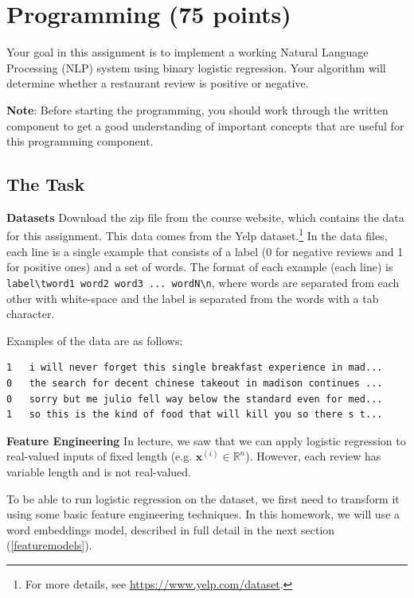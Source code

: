\documentclass[11pt,addpoints,answers]{exam}
\newcommand{\xv}{\mathbf{x}}
\begin{document}
\section{Programming (75 points)}

Your goal in this assignment is to implement a working Natural Language Processing (NLP) system using binary logistic regression. Your algorithm will determine whether a restaurant review is positive or negative.

\textbf{Note}: Before starting the programming, you should work through the written component to get a good understanding of important concepts that are useful for this programming component.



\subsection{The Task}\label{task}

{\bf Datasets } 
Download the zip file from the course website, which contains the data for this assignment. This data comes from the Yelp dataset.\footnote{For more details, see \url{https://www.yelp.com/dataset}.} In the data files, each line is a single example that consists of a label (0 for negative reviews and 1 for positive ones) and a set of words. The format of each example (each line) is \lstinline{label\tword1 word2 word3 ... wordN\n}, where words are separated from each other with white-space and the label is separated from the words with a tab character.

Examples of the data are as follows:
 
\begin{lstlisting}
1   i will never forget this single breakfast experience in mad... 
0   the search for decent chinese takeout in madison continues ...
0   sorry but me julio fell way below the standard even for med...
1   so this is the kind of food that will kill you so there s t...
\end{lstlisting}

{\bf Feature Engineering } 
In lecture, we saw that we can apply logistic regression to real-valued inputs of fixed length (e.g. $\xv^{(i)}\in\mathbb{R}^n$). However, each review has variable length and is not real-valued.

To be able to run logistic regression on the dataset, we first need to transform it using some basic feature engineering techniques. In this homework, we will use a word embeddings model, described in full detail in the next section (\ref{featuremodels}).
\end{document}
